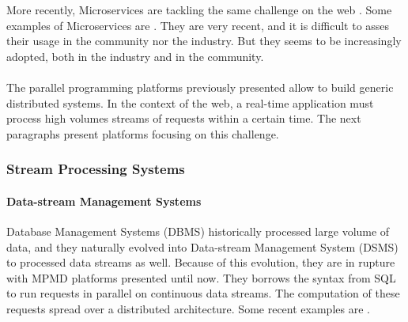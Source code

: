 More recently, Microservices are tackling the same challenge on the web \cite{Fernandez-Villamor2010,Fowler2014,Namiot2014}.
Some examples of Microservices are .
They are very recent, and it is difficult to asses their usage in the community nor the industry.
But they seems to be increasingly adopted, both in the industry and in the community.



\paragraph{}

The parallel programming platforms previously presented allow to build generic distributed systems.
In the context of the web, a real-time application must process high volumes streams of requests within a certain time.
The next paragraphs present platforms focusing on this challenge.


\subsubsection{Stream Processing Systems}


\paragraph{Data-stream Management Systems}

Database Management Systems (DBMS) historically processed large volume of data, and they naturally evolved into Data-stream Management System (DSMS) to processed data streams as well.
Because of this evolution, they are in rupture with MPMD platforms presented until now.
They borrows the syntax from SQL to run requests in parallel on continuous data streams.
The computation of these requests spread over a distributed architecture.
Some recent examples are .


